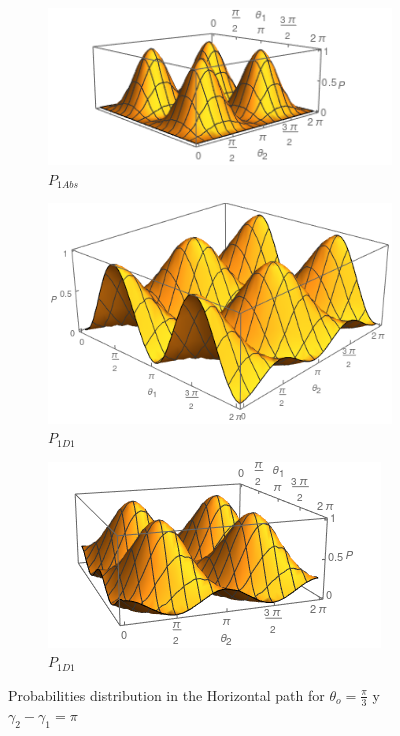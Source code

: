 \documentclass[12pt]{article}
\begin{document}
\begin{figure}[t!]
\centering
\begin{subfigure}[b]{0.45\linewidth}
\includegraphics[width=\linewidth]{images/P11abs.png}
\caption{$P_{1Abs}$}
\label{fig:BS1}
\end{subfigure}
\begin{subfigure}[b]{0.45\linewidth}
\includegraphics[width=\linewidth ,height=3 cm]{images/P11d1.png}
\caption{$P_{1D1}$}
\label{fig:westminster_aerea}
\end{subfigure}
\begin{subfigure}[b]{0.45\linewidth}
\includegraphics[width=\linewidth]{images/P11d2.png}
\caption{$P_{1D1}$}
\label{fig:BS1}
\end{subfigure}
\caption{Probabilities distribution in the Horizontal path for $\theta_{o}=\frac{\pi}{3}$ y $\gamma_{2}-\gamma_{1}=\pi$}
\label{fig:westminster}
\end{figure} 
\end{document}
